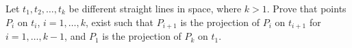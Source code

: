 Let $t_1,t_2,\ldots,t_k$ be different straight lines in space, where $k>1$. Prove that points $P_i$ on $t_i$,  $i=1,\ldots,k$,  exist such that $P_{i+1}$ is the projection of $P_i$ on $t_{i+1}$ for $i=1,\ldots,k-1$,  and $P_1$ is the projection of $P_k$ on $t_1$.